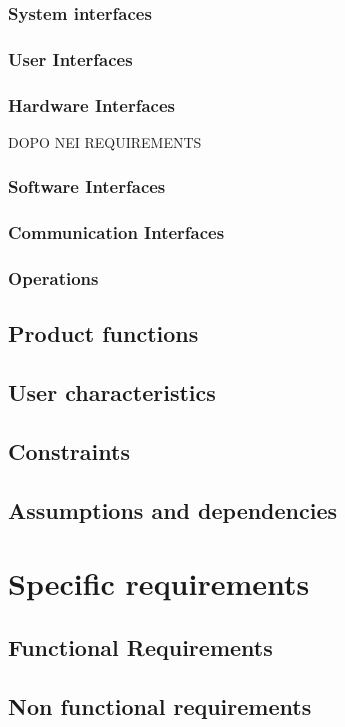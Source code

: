 \documentclass{article}
\begin{document}
\subsubsection{System interfaces}
\subsubsection{User Interfaces}
\subsubsection{Hardware Interfaces}		DOPO NEI REQUIREMENTS
\subsubsection{Software Interfaces}
\subsubsection{Communication Interfaces}
\subsubsection{Operations} 
\subsection{Product functions}
\subsection{User characteristics}
\subsection{Constraints}
\subsection{Assumptions and dependencies}
\section{Specific requirements}
\subsection{Functional Requirements}
\subsection{Non functional requirements}
\end{document}
